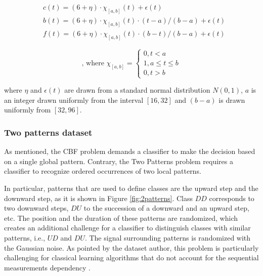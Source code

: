 \noindent\begin{minipage}{.5\linewidth}
\begin{equation*}
\begin{split}
 &c(t)=(6+\eta)\cdot\chi_{[a,b]}(t)+\epsilon(t) \\
 & b(t)=(6+\eta)\cdot\chi_{[a,b]}(t)\cdot(t-a)/(b-a)+\epsilon(t) \\
 & f(t)=(6+\eta)\cdot\chi_{[a,b]}(t)\cdot(b-t)/(b-a)+\epsilon(t)
\end{split}
\end{equation*}
\end{minipage}%
\begin{minipage}{.5\linewidth}
\begin{equation}
\label{eq:cbf}
\text{, where }
\chi_{[a,b]}=\begin{cases}
0,t < a \\
1,a\leq t\leq b\\
0,t > b \end{cases}
\end{equation}
\end{minipage}

\noindent where $\eta$ and $\epsilon(t)$ are drawn from a standard normal distribution $N(0,1)$, $a$ is an integer 
drawn uniformly from the interval $[16,32]$ and $(b-a)$ is drawn uniformly from $[32,96]$.

\subsubsection{Two patterns dataset}
As mentioned, the CBF problem demands a classifier to make the decision based on a single global pattern. 
Contrary, the Two Patterns problem requires a classifier to recognize ordered occurrences of two local patterns.

In particular, patterns that are used to define classes are the upward step and the downward step,
as it is shown in Figure \ref{fig:2patterns}. Class $DD$ corresponds to two downward steps, $DU$ to the succession
of a downward and an upward step, etc. The position and the duration of these patterns are randomized, 
which creates an additional challenge for a classifier to distinguish classes with similar patterns, i.e., $UD$ and $DU$.
The signal surrounding patterns is randomized with the Gaussian noise. 
As pointed by the dataset author, this problem is particularly challenging for classical learning 
algorithms that do not account for the sequential measurements dependency \cite{two_patterns}.

